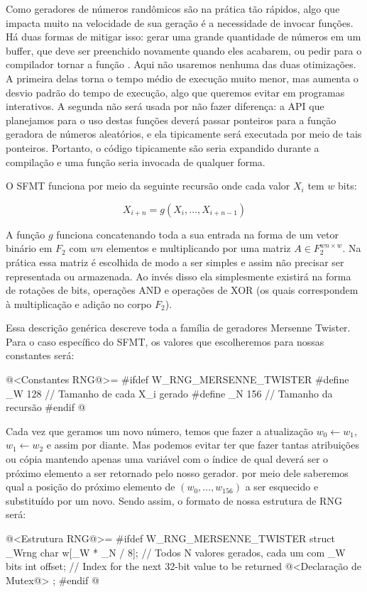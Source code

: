 Como geradores de números randômicos são na prática tão rápidos, algo
que impacta muito na velocidade de sua geração é a necessidade de
invocar funções. Há duas formas de mitigar isso: gerar uma grande
quantidade de números em um buffer, que deve ser preenchido novamente
quando eles acabarem, ou pedir para o compilador tornar a
função . Aqui não usaremos nenhuma das duas
otimizações. A primeira delas torna o tempo médio de execução muito
menor, mas aumenta o desvio padrão do tempo de execução, algo que
queremos evitar em programas interativos. A segunda não será usada por
não fazer diferença: a API que planejamos para o uso destas funções
deverá passar ponteiros para a função geradora de números aleatórios,
e ela tipicamente será executada por meio de tais ponteiros. Portanto,
o código tipicamente são seria expandido durante a compilação e uma
função seria invocada de qualquer forma.

O SFMT funciona por meio da seguinte recursão onde cada valor $X_i$ tem
$w$ bits:

$$
X_{i+n}=g(X_i, \ldots, X_{i+n-1})
$$

A função $g$ funciona concatenando toda a sua entrada na forma de um
vetor binário em $F_2$ com $wn$ elementos e multiplicando por
uma matriz $A\in F_2^{wn\times w}$. Na prática essa matriz é
escolhida de modo a ser simples e assim não precisar ser representada
ou armazenada. Ao invés disso ela simplesmente existirá na forma de
rotações de bits, operações AND e operações de XOR (os quais
correspondem à multiplicação e adição no corpo $F_2$).

Essa descrição genérica descreve toda a família de geradores Mersenne
Twister. Para o caso específico do SFMT, os valores que escolheremos
para nossas constantes será:

\iniciocodigo
@<Constantes RNG@>=
#ifdef W_RNG_MERSENNE_TWISTER
#define _W 128 // Tamanho de cada X_i gerado
#define _N 156 // Tamanho da recursão
#endif
@
\fimcodigo

Cada vez que geramos um novo número, temos que fazer a atualização
$w_0 \leftarrow w_1$, $w_1 \leftarrow w_2$ e assim por diante. Mas
podemos evitar ter que fazer tantas atribuições ou cópia mantendo
apenas uma variável com o índice de qual deverá ser o próximo elemento
a ser retornado pelo nosso gerador. por meio dele saberemos qual a
posição do próximo elemento de $(w_0, \ldots, w_{156})$ a ser
esquecido e substituído por um novo. Sendo assim, o formato de nossa
estrutura de RNG será:

\iniciocodigo
@<Estrutura RNG@>=
#ifdef W_RNG_MERSENNE_TWISTER
struct _Wrng{
  char w[_W * _N / 8]; // Todos N valores gerados, cada um com _W bits
  int offset;         // Index for the next 32-bit value to be returned
  @<Declaração de Mutex@>
};
#endif
@
\fimcodigo

